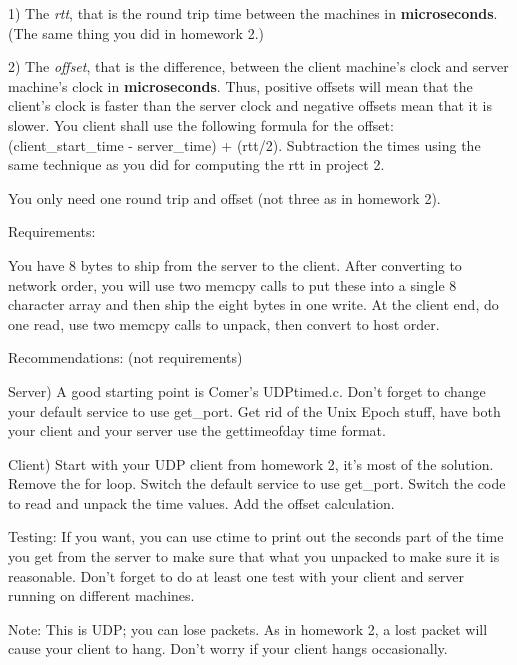 1) The {\it rtt}, that is the round trip time between the machines
in {\bf microseconds}. (The same thing you did in homework 2.)

2) The {\it offset}, that is the difference,
between the client machine's clock and server machine's clock in 
{\bf microseconds}.
Thus, positive offsets will mean that the client's clock is faster than the 
server clock and negative offsets mean that it is slower.
You client shall use the following formula for the offset:
\hfill\break
{\ltt{}(client_start_time - server_time) + (rtt/2)}.
Subtraction the times using the same technique as you did for computing
the rtt in project 2.

You only need one round trip and offset (not three as in homework 2).

Requirements:

You have 8 bytes to ship from the server to the client.
After converting to network order, you will use two 
{\ltt{}memcpy} calls to put these
into a single 8 character array and then ship the eight bytes in one write.
At the client end, do one read, use two {\ltt{}memcpy} calls to unpack,
then convert to host order.

\bigskip
Recommendations: (not requirements)

Server)
A good starting point is Comer's {\ltt{}UDPtimed.c}.
Don't forget to change your default {\ltt{}service} to use
{\ltt{}get_port}.
Get rid of the Unix Epoch stuff, have both your client and your server
use the {\ltt{}gettimeofday} time format.

Client) 
Start with your UDP client from homework 2, it's most of the solution.
Remove the {\ltt{}for} loop.
Switch the default service to use {\ltt{}get_port}.
Switch the code to read and unpack the time values.
Add the offset calculation.


Testing:
If you want, you can use {\ltt{}ctime} to print out the seconds part of
the time you get from the server to make sure that what you unpacked
to make sure it is reasonable. Don't forget to do at least one test
with your client and server running on different machines.

Note:
This is UDP; you can lose packets.
As in homework 2, a lost packet will cause your client to hang.
Don't worry if your client hangs occasionally.


\bye
